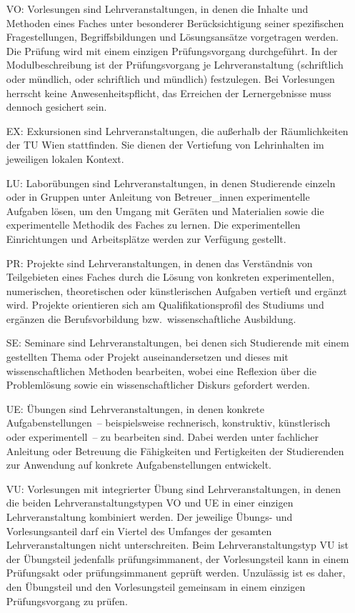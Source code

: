 \begin{enumerate}[font=\sffamily\textbf,align=left]
\item[VO:] Vorlesungen sind Lehrveranstaltungen, in denen die Inhalte
  und Methoden eines Faches unter besonderer Berücksichtigung seiner
  spezifischen Fragestellungen, Begriffsbildungen und Lösungsansätze
  vorgetragen werden. Die Prüfung wird mit einem einzigen
  Prüfungsvorgang durchgeführt. In der Modulbeschreibung ist der
  Prüfungsvorgang je Lehrveranstaltung (schriftlich oder mündlich,
  oder schriftlich und mündlich) festzulegen. Bei Vorlesungen herrscht
  keine Anwesenheitspflicht, das Erreichen der Lernergebnisse muss
  dennoch gesichert sein.
\item[EX:] Exkursionen sind Lehrveranstaltungen, die außerhalb der
  Räumlichkeiten der TU Wien stattfinden. Sie dienen der Vertiefung
  von Lehrinhalten im jeweiligen lokalen Kontext.
\item[LU:] Laborübungen sind Lehrveranstaltungen, in denen Studierende
  einzeln oder in Gruppen unter Anleitung von Betreuer\_innen
  experimentelle Aufgaben lösen, um den Umgang mit Geräten und
  Materialien sowie die experimentelle Methodik des Faches zu
  lernen. Die experimentellen Einrichtungen und Arbeitsplätze werden
  zur Verfügung gestellt.
\item[PR:] Projekte sind Lehrveranstaltungen, in denen das
  Verständnis von Teilgebieten eines Faches durch die Lösung von
  konkreten experimentellen, numerischen, theoretischen oder
  künstlerischen Aufgaben vertieft und ergänzt wird. Projekte
  orientieren sich am Qualifikationsprofil des Studiums und ergänzen
  die Berufsvorbildung bzw.\ wissenschaftliche Ausbildung.
\item[SE:] Seminare sind Lehrveranstaltungen, bei denen sich
  Studierende mit einem gestellten Thema oder Projekt
  auseinandersetzen und dieses mit wissenschaftlichen Methoden
  bearbeiten, wobei eine Reflexion über die Problemlösung sowie ein
  wissenschaftlicher Diskurs gefordert werden.
\item[UE:] Übungen sind Lehrveranstaltungen, in denen konkrete
  Aufgabenstellungen~-- beispielsweise rechnerisch, konstruktiv,
  künstlerisch oder experimentell~-- zu bearbeiten sind. Dabei werden
  unter fachlicher Anleitung oder Betreuung die Fähigkeiten und
  Fertigkeiten der Studierenden zur Anwendung auf konkrete
  Aufgabenstellungen entwickelt.
\item[VU:] Vorlesungen mit integrierter Übung sind
  Lehrveranstaltungen, in denen die beiden Lehrveranstaltungstypen VO
  und UE in einer einzigen Lehrveranstaltung kombiniert werden. Der
  jeweilige Übungs- und Vorlesungsanteil darf ein Viertel des Umfanges
  der gesamten Lehrveranstaltungen nicht unterschreiten. Beim
  Lehrveranstaltungstyp VU ist der Übungsteil jedenfalls
  prüfungsimmanent, der Vorlesungsteil kann in einem Prüfungsakt oder
  prüfungsimmanent geprüft werden. Unzulässig ist es daher, den
  Übungsteil und den Vorlesungsteil gemeinsam in einem einzigen
  Prüfungsvorgang zu prüfen.
\end{enumerate}


